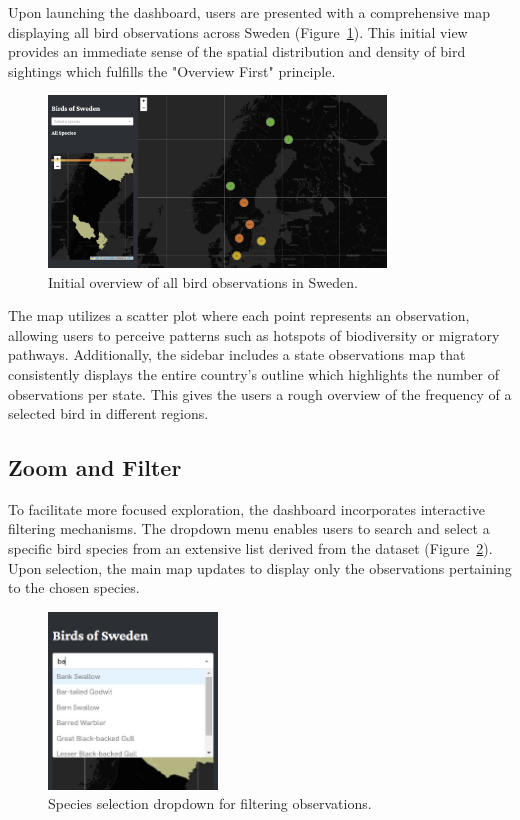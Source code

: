 Upon launching the dashboard, users are presented with a comprehensive map displaying all bird observations across Sweden (Figure~\ref{fig:overview}). This initial view provides an immediate sense of the spatial distribution and density of bird sightings which fulfills the "Overview First" principle.

\begin{figure}[h] 
    \centering 
    \includegraphics[width=0.8\textwidth]{figures/overview_map.jpg} 
    \caption{Initial overview of all bird observations in Sweden.} 
    \label{fig:overview} 
\end{figure}

The map utilizes a scatter plot where each point represents an observation, allowing users to perceive patterns such as hotspots of biodiversity or migratory pathways. Additionally, the sidebar includes a state observations map that consistently displays the entire country's outline which highlights the number of observations per state. This gives the users a rough overview of the frequency of a selected bird in different regions.

\subsection{Zoom and Filter}

To facilitate more focused exploration, the dashboard incorporates interactive filtering mechanisms. The dropdown menu enables users to search and select a specific bird species from an extensive list derived from the dataset (Figure~\ref{fig:dropdown}). Upon selection, the main map updates to display only the observations pertaining to the chosen species.

\begin{figure}[h] 
    \centering 
    \includegraphics[width=0.4\textwidth]{figures/species_dropdown.jpg} 
    \caption{Species selection dropdown for filtering observations.} 
    \label{fig:dropdown} 
\end{figure}


